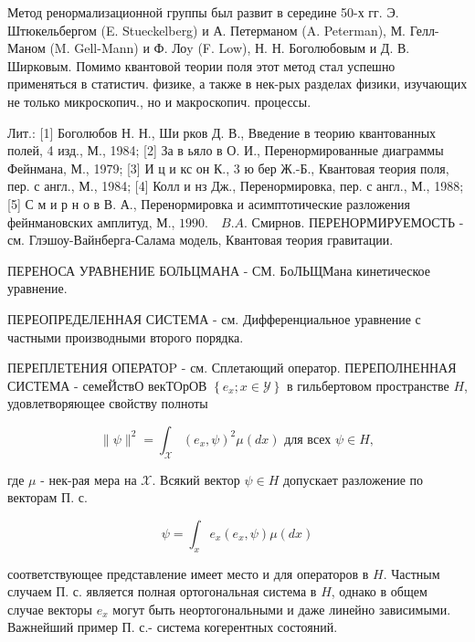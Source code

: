 \documentclass[10pt]{article}
\begin{document}
Метод ренормализационной группы был развит в середине 50-х гг. Э. Штюкельбергом (E. Stueckelberg) и А. Петерманом (A. Peterman), М. Гелл-Маном (M. Gell-Mann) и Ф. Лоy (F. Low), Н. Н. Боголюбовым и Д. В. Ширковым. Помимо квантовой теории поля этот метод стал успешно применяться в статистич. физике, а также в нек-рых разделах физики, изучающих не только микроскопич., но и макроскопич. процессы.



Лит.: [1] Боголюбов Н. Н., Ши рков Д. В., Введение в теорию квантованных полей, 4 изд., М., 1984; [2] За в ьяло в О. И., Перенормированные диаграммы Фейнмана, М., 1979; [3] И ц и кс он К., 3 ю бер Ж.-Б., Квантовая теория поля, пер. с англ., М., 1984; [4] Колл и нз Дж., Перенормировка, пер. с англ., М., 1988; [5] С м и р н о в В. А., Перенормировка и асимптотические разложения фейнмановских амплитуд, М., $1990 . \quad B . A$. Смирнов. ПЕРЕНОРМИРУЕМОСТЬ - см. Глэшоу-Вайнберга-Салама модель, Квантовая теория гравитации.



ПЕРЕНОСА УРАВНЕНИЕ БОЛЬЦМАНА - СМ. БоЛЬЩМана кинетическое уравнение.



ПЕРЕОПРЕДЕЛЕННАЯ СИСТЕМА - см. Дифференциальное уравнение с частными производными второго порядка.



ПЕРЕПЛЕТЕНИЯ ОПЕРАТОP - см. Сплетающий оператор. ПЕРЕПОЛНЕННАЯ СИСТЕМА - семеЙствО векТОрОВ $\left\{e_{x} ; x \in \mathscr{Y}\right\}$ в гильбертовом пространстве $H$, удовлетворяющее свойству полноты



\[

\|\psi\|^{2}=\int_{\mathscr{X}}\left(e_{x}, \psi\right)^{2} \mu(d x) \text { для всех } \psi \in H,

\]



где $\mu$ - нек-рая мера на $\mathscr{X}$. Всякий вектор $\psi \in H$ допускает разложение по векторам П. с.



\[

\psi=\int_{x} e_{x}\left(e_{x}, \psi\right) \mu(d x)

\]



соответствующее представление имеет место и для операторов в $H$. Частным случаем П. с. является полная ортогональная система в $H$, однако в общем случае векторы $e_{x}$ могут быть неортогональными и даже линейно зависимыми. Важнейший пример П. с.- система когерентных состояний.
\end{document}
